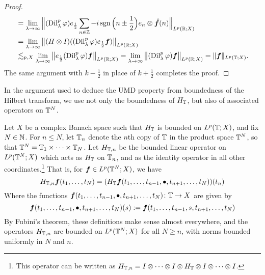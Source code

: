 \begin{proof}
\begin{equation*}
\begin{aligned}
         &= \lim_{\lambda \to \infty} \Big\| (\operatorname{Dil}_{\lambda}^{p}\varphi) e_{\frac{1}{2}} \sum_{n \in \mathbb{Z}} -i \operatorname{sgn}\Big(n\pm\frac{1}{2}\Big) e_{n} \otimes \hat{\bm{f}}(n) \Big\|_{L^p(\mathbb{R};X)} \\
         &= \lim_{\lambda \to \infty} \big\| (H \otimes I)((\operatorname{Dil}_{\lambda}^{p} \varphi)e_{\frac{1}{2}} \bm{f}) \big\|_{L^p(\mathbb{R};X)} \\
         &\lesssim_{p,X} \lim_{\lambda \to \infty} \big\| e_{\frac{1}{2}} (\operatorname{Dil}_{\lambda}^{p} \varphi)  \bm{f} \big\|_{L^p(\mathbb{R};X)} 
         = \lim_{\lambda \to \infty} \big\| (\operatorname{Dil}_{\lambda}^{p} \varphi)  \bm{f} \big\|_{L^p(\mathbb{R};X)} 
         = \| \bm{f} \|_{L^p(\mathbb{T};X)}.
       \end{aligned}
     \end{equation*}
     The same argument with $k - \frac{1}{2}$ in place of $k + \frac{1}{2}$ completes the proof.
  \end{proof}

  In the argument used to deduce the UMD property from boundedness of the Hilbert transform, we use not only the boundedness of $H_{\mathbb{T}}$, but also of associated operators on $\mathbb{T}^{N}$.

  \begin{defn}\label{defn:higher-HT}
    Let $X$ be a complex Banach space such that $H_{\mathbb{T}}$ is bounded on $L^p(\mathbb{T};X)$, and fix $N \in \mathbb{N}$.
    For $n \leq N$, let $\mathbb{T}_{n}$ denote the $n$th copy of $\mathbb{T}$ in the product space $\mathbb{T}^{N}$, so that $\mathbb{T}^{N} = \mathbb{T}_{1} \times \cdots \times \mathbb{T}_{N}$.
    Let $H_{\mathbb{T},n}$ be the bounded linear operator on $L^p(\mathbb{T}^{N};X)$ which acts as $H_{\mathbb{T}}$ on $\mathbb{T}_{n}$, and as the identity operator in all other coordinates.\footnote{This operator can be written as $H_{\mathbb{T},n} = I \otimes \cdots \otimes I \otimes H_{\mathbb{T}} \otimes I \otimes \cdots \otimes I$.}
    That is, for $\bm{f} \in L^p(\mathbb{T}^{N};X)$, we have
    \begin{equation*}
      H_{\mathbb{T},n}\bm{f}(t_{1}, \ldots, t_{N}) = (H_{\mathbb{T}} \bm{f}(t_{1}, \ldots, t_{n-1}, \bullet, t_{n+1}, \ldots, t_{N}))(t_{n})
    \end{equation*}
    Where the functions $\bm{f}(t_{1}, \ldots, t_{n-1}, \bullet, t_{n+1}, \ldots, t_{N}) \colon \mathbb{T} \to X$ are given by
    \begin{equation*}
      \bm{f}(t_{1}, \ldots, t_{n-1}, \bullet, t_{n+1}, \ldots, t_{N})(s) := \bm{f}(t_{1}, \ldots, t_{n-1}, s, t_{n+1}, \ldots, t_{N})
    \end{equation*}
    By Fubini's theorem, these definitions make sense almost everywhere, and the operators $H_{\mathbb{T},n}$ are bounded on $L^p(\mathbb{T}^{N};X)$ for all $N \geq n$, with norms bounded uniformly in $N$ and $n$.
  \end{defn}

